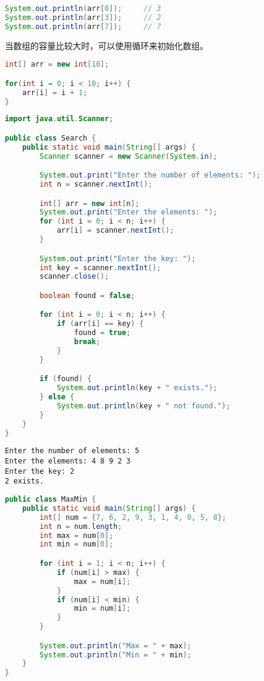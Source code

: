 \begin{lstlisting}[language=Java]
System.out.println(arr[0]);		// 3
System.out.println(arr[3]);		// 2
System.out.println(arr[7]);		// 7
\end{lstlisting}

当数组的容量比较大时，可以使用循环来初始化数组。

\vspace{-0.5cm}

\begin{lstlisting}[language=Java]
int[] arr = new int[10];

for(int i = 0; i < 10; i++) {
	arr[i] = i + 1;
}
\end{lstlisting}

\vspace{0.5cm}


\begin{lstlisting}[language=Java]
import java.util.Scanner;

public class Search {
	public static void main(String[] args) {
		Scanner scanner = new Scanner(System.in);

		System.out.print("Enter the number of elements: ");
		int n = scanner.nextInt();

		int[] arr = new int[n];
		System.out.print("Enter the elements: ");
		for (int i = 0; i < n; i++) {
			arr[i] = scanner.nextInt();
		}

		System.out.print("Enter the key: ");
		int key = scanner.nextInt();
		scanner.close();

		boolean found = false;

		for (int i = 0; i < n; i++) {
			if (arr[i] == key) {
				found = true;
				break;
			}
		}

		if (found) {
			System.out.println(key + " exists.");
		} else {
			System.out.println(key + " not found.");
		}
	}
}	
\end{lstlisting}

\begin{tcolorbox}
	\begin{verbatim}
Enter the number of elements: 5
Enter the elements: 4 8 9 2 3
Enter the key: 2
2 exists.
	\end{verbatim}
\end{tcolorbox}

\vspace{0.5cm}


\begin{lstlisting}[language=Java]
public class MaxMin {
	public static void main(String[] args) {
		int[] num = {7, 6, 2, 9, 3, 1, 4, 0, 5, 8};
		int n = num.length;
		int max = num[0];
		int min = num[0];

		for (int i = 1; i < n; i++) {
			if (num[i] > max) {
				max = num[i];
			}
			if (num[i] < min) {
				min = num[i];
			}
		}

		System.out.println("Max = " + max);
		System.out.println("Min = " + min);
	}
}
\end{lstlisting}

